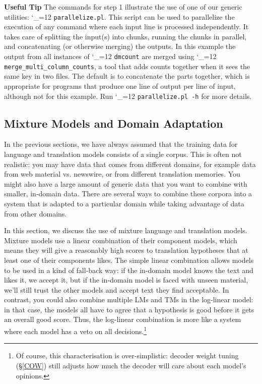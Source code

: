 \documentclass[11pt,letterpaper]{article}
\def\code{\begingroup\catcode`\_=12 \codex}
\newcommand{\codex}[1]{\texttt{#1}\endgroup}
\newcommand{\tip}{\textbf{Useful Tip \large{\ding{43}} }}
\newcommand{\margintip}{\marginpar[{\textbf{Tip \large{\ding{43}}}}]{\textbf{\reflectbox{\large{\ding{43}}} Tip}}}
\newcommand{\tipend}{\textbf{ \reflectbox{\large{\ding{43}}}}}
\begin{document}
\tip\margintip The commands for step 1 illustrate the use of one of our generic
utilities: \code{parallelize.pl}.  This script can be used to parallelize the
execution of any command where each input line is processed independently.  It
takes care of splitting the input(s) into chunks, running the chunks in
parallel, and concatenating (or otherwise merging) the outputs.  In this
example the output from all instances of \code{dmcount} are merged using
\code{merge_multi_column_counts}, a tool that adds counts together when it sees
the same key in two files.  The default is to concatenate the parts together,
which is appropriate for programs that produce one line of output per line of
input, although not for this example.  Run \code{parallelize.pl -h} for more
details.\tipend

\subsection{Mixture Models and Domain Adaptation} \label{MIX}

In the previous sections, we have always assumed that the training data for
language and translation models consists of a single corpus.  This is often not
realistic: you may have data that comes from different domains, for example
data from web material vs. newswire, or from different translation memories.
You might also have a large amount of generic data that you want to combine
with smaller, in-domain data.  There are several ways to combine these corpora
into a system that is adapted to a particular domain while taking advantage of
data from other domains.

In this section, we discuss the use of mixture language and translation models.
Mixture models use a linear combination of their component models, which means
they will give a reasonably high scores to translation hypotheses that at least
one of their components likes.  The simple linear combination allows models to
be used in a kind of fall-back way: if the in-domain model knows the text and
likes it, we accept it, but if the in-domain model is faced with unseen
material, we'll still trust the other models and accept text they find
acceptable.  In contrast, you could also combine multiple LMs and TMs in the
log-linear model: in that case, the models all have to agree that a hypothesis
is good before it gets an overall good score.  Thus, the log-linear combination
is more like a system where each model has a veto on all decisions.\footnote{Of
course, this characterisation is over-simplistic: decoder weight tuning
(\S\ref{COW}) still adjusts how much the decoder will care about each model's
opinions.}
\end{document}
